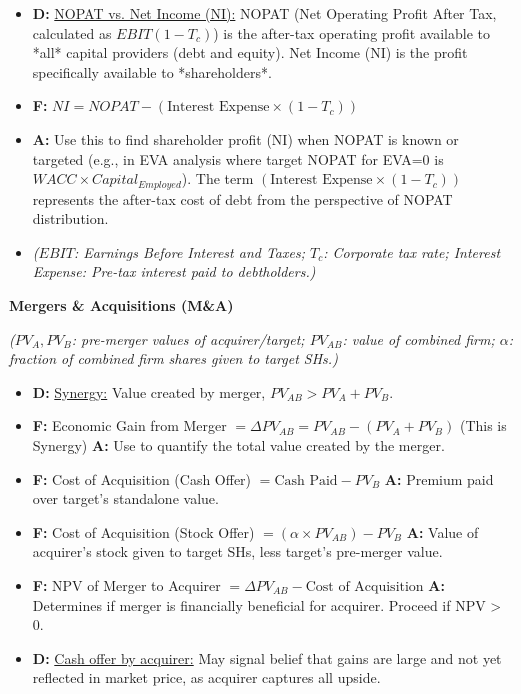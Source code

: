 \documentclass[7pt,landscape]{extarticle} %
\newcommand{\cheatsheetsubsubsection}[1]{%
  \vspace{0.15ex plus 0.05ex minus 0.05ex}%
  \noindent\textbf{\sffamily\scriptsize #1}%
  \par\vspace{0.05ex}%
}
\newcommand{\D}[1]{\textbf{\textcolor{DefColor}{D:}} \uline{#1}}
\newcommand{\F}[1]{\textbf{\textcolor{FormColor}{F:}} #1}
\newcommand{\A}[1]{\textbf{\textcolor{AppColor}{A:}} #1}
\newcommand{\SF}[1]{\textit{\small (#1)}} %
\begin{document}
\begin{multicols*}{4}
\begin{itemize}
    \item \D{NOPAT vs. Net Income (NI):} NOPAT (Net Operating Profit After Tax, calculated as $EBIT(1-T_c)$) is the after-tax operating profit available to *all* capital providers (debt and equity). Net Income (NI) is the profit specifically available to *shareholders*.
    \item \F{$NI = NOPAT - (\text{Interest Expense} \times (1-T_c))$}
    \item \A{Use this to find shareholder profit (NI) when NOPAT is known or targeted (e.g., in EVA analysis where target NOPAT for EVA=0 is $WACC \times Capital_{Employed}$). The term $(\text{Interest Expense} \times (1-T_c))$ represents the after-tax cost of debt from the perspective of NOPAT distribution.}
    \item \SF{$EBIT$: Earnings Before Interest and Taxes; $T_c$: Corporate tax rate; Interest Expense: Pre-tax interest paid to debtholders.}
  \end{itemize}
  
  \cheatsheetsubsubsection{Mergers \& Acquisitions (M\&A)}
  \SF{$PV_A, PV_B$: pre-merger values of acquirer/target; $PV_{AB}$: value of combined firm; $\alpha$: fraction of combined firm shares given to target SHs.}
  \begin{itemize}
    \item \D{Synergy:} Value created by merger, $PV_{AB} > PV_A + PV_B$.
    \item \F{Economic Gain from Merger $= \Delta PV_{AB} = PV_{AB} - (PV_A + PV_B)$ (This is Synergy)}
          \A{Use to quantify the total value created by the merger.}
    \item \F{Cost of Acquisition (Cash Offer) $= \text{Cash Paid} - PV_B$}
          \A{Premium paid over target's standalone value.}
    \item \F{Cost of Acquisition (Stock Offer) $= (\alpha \times PV_{AB}) - PV_B$}
          \A{Value of acquirer's stock given to target SHs, less target's pre-merger value.}
    \item \F{NPV of Merger to Acquirer $= \Delta PV_{AB} - \text{Cost of Acquisition}$}
          \A{Determines if merger is financially beneficial for acquirer. Proceed if NPV > 0.}
    \item \D{Cash offer by acquirer:} May signal belief that gains are large and not yet reflected in market price, as acquirer captures all upside.
  \end{itemize}
  

\end{multicols*}
\end{document}
